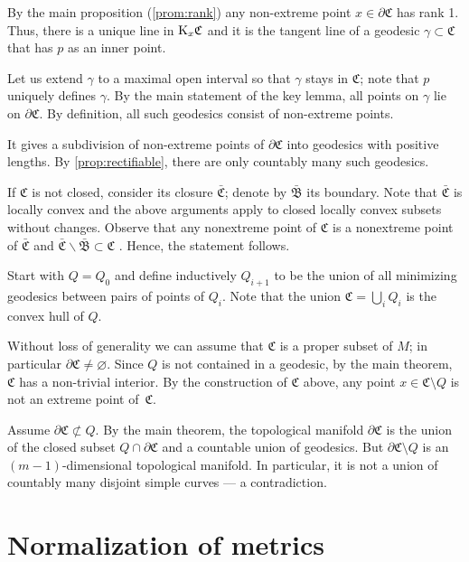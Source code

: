 \documentclass[a4paper,10pt]{article}
\begin{document}
By the main proposition (\ref{prom:rank}) any non-extreme point $x\in \partial \mathfrak C$ has rank 1.
Thus, there is a unique line in $\mathrm{K}_x\mathfrak C$ and it is the tangent line of a geodesic $\gamma\subset\mathfrak C$ that has $p$ as an inner point. 

Let us extend $\gamma$ to a maximal open interval so that $\gamma$ stays in $\mathfrak C$;
note that $p$ uniquely defines $\gamma$. 
By the main statement of the key lemma, all points on $\gamma$ lie on $\partial \mathfrak C$.
By definition, all such geodesics consist of non-extreme points.

It gives a subdivision of non-extreme points of $\partial\mathfrak C$ into geodesics with positive lengths.
By \ref{prop:rectifiable}, there are only countably many such geodesics.

If $\mathfrak C$ is not closed, consider its closure $\bar {\mathfrak C}$;
denote by $\bar{\mathfrak{B}}$ its boundary.
Note that $\bar{\mathfrak C}$ is locally convex and the above arguments apply to closed locally convex subsets without changes.
Observe that any nonextreme point of $\mathfrak{C}$ is a  nonextreme point of $\bar{\mathfrak{C}}$ and $\bar{\mathfrak{C}}\backslash\bar{\mathfrak{B}}\subset\mathfrak{C}$ \cite[Lemma 1.5]{cheeger-gromoll}.
Hence, the statement follows.
\qeds

Start with $Q=Q_0$ and define inductively $Q_{i+1}$ to be the union of all minimizing geodesics between pairs of points of $Q_i$.
Note that the union $\mathfrak{C}= \bigcup_{i} 
Q_i$ is the convex hull of $Q$.

Without loss of generality we can assume that $\mathfrak{C}$ is a proper subset of $M$; in particular $\partial\mathfrak{C}\ne \varnothing$.
Since $Q$ is not contained in a geodesic, by the main theorem, $\mathfrak{C}$ has a non-trivial interior.
By the construction of $\mathfrak{C}$ above, any point $x\in \mathfrak{C} \setminus Q$ is not an extreme point of~$\mathfrak{C}$.

Assume $\partial \mathfrak{C} \not\subset Q$.
By the main theorem, the topological manifold $\partial \mathfrak{C}$ is the union of the closed subset $Q\cap \partial \mathfrak{C}$ and a countable union of geodesics.
But $\partial \mathfrak{C} \setminus Q$ is an $(m-1)$-dimensional topological manifold.
In particular, it is not a union of countably many disjoint simple curves --- a contradiction.
\qeds

\appendix

\section{Normalization of metrics}
\label{sec:normalization}
\end{document}
